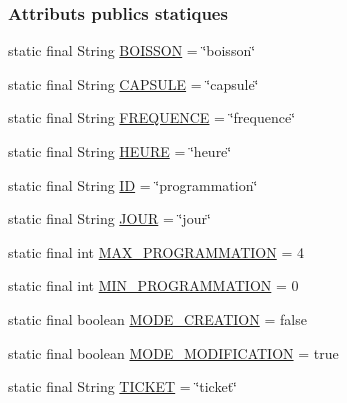 \subsubsection*{Attributs publics statiques}
\begin{DoxyCompactItemize}
\item 
static final String \hyperlink{classcom_1_1example_1_1ekawa_1_1_programmation_a87e9e78f01480283f2d4fa9f14443034}{B\+O\+I\+S\+S\+ON} = \char`\"{}boisson\char`\"{}
\item 
static final String \hyperlink{classcom_1_1example_1_1ekawa_1_1_programmation_a44b5687d27784aed685c77cf79d419fd}{C\+A\+P\+S\+U\+LE} = \char`\"{}capsule\char`\"{}
\item 
static final String \hyperlink{classcom_1_1example_1_1ekawa_1_1_programmation_aa5b1e7bbc58f4fef972e733498781a8e}{F\+R\+E\+Q\+U\+E\+N\+CE} = \char`\"{}frequence\char`\"{}
\item 
static final String \hyperlink{classcom_1_1example_1_1ekawa_1_1_programmation_aafa433ee13f4473d27cd7db34bbc4584}{H\+E\+U\+RE} = \char`\"{}heure\char`\"{}
\item 
static final String \hyperlink{classcom_1_1example_1_1ekawa_1_1_programmation_ae0552520e4ca9dc152bb503a7a00bf3a}{ID} = \char`\"{}programmation\char`\"{}
\item 
static final String \hyperlink{classcom_1_1example_1_1ekawa_1_1_programmation_a6ec3fe1846e45e6c0794eebdffeaf54b}{J\+O\+UR} = \char`\"{}jour\char`\"{}
\item 
static final int \hyperlink{classcom_1_1example_1_1ekawa_1_1_programmation_a056f8e2549c22393882b7306223a64c2}{M\+A\+X\+\_\+\+P\+R\+O\+G\+R\+A\+M\+M\+A\+T\+I\+ON} = 4
\item 
static final int \hyperlink{classcom_1_1example_1_1ekawa_1_1_programmation_a1167f22eb96c9c94bfc407aa3e166237}{M\+I\+N\+\_\+\+P\+R\+O\+G\+R\+A\+M\+M\+A\+T\+I\+ON} = 0
\item 
static final boolean \hyperlink{classcom_1_1example_1_1ekawa_1_1_programmation_a79242eac5d971bdb23eaf4ab930f774d}{M\+O\+D\+E\+\_\+\+C\+R\+E\+A\+T\+I\+ON} = false
\item 
static final boolean \hyperlink{classcom_1_1example_1_1ekawa_1_1_programmation_a33fb0a465e66ba5854a07e3050c12c04}{M\+O\+D\+E\+\_\+\+M\+O\+D\+I\+F\+I\+C\+A\+T\+I\+ON} = true
\item 
static final String \hyperlink{classcom_1_1example_1_1ekawa_1_1_programmation_aa04b411478bfe88f8f53057dfca5c650}{T\+I\+C\+K\+ET} = \char`\"{}ticket\char`\"{}
\end{DoxyCompactItemize}
